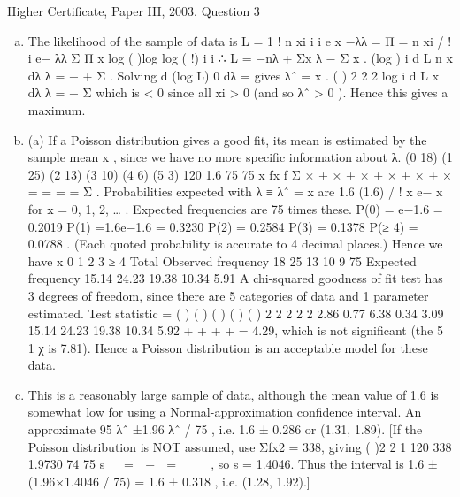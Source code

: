 \documentclass[a4paper,12pt]{article}
\begin{document}
Higher Certificate, Paper III, 2003. Question 3
\begin{enumerate}[(a)]
\item  The likelihood of the sample of data is L =
1 !
n xi
i i
e
x
−λλ
= Π
= n xi / !
i e− λλ Σ Π x
log ( )log log ( !) i i ∴ L = −nλ + Σx λ − Σ x .
(log ) i d L n x
dλ λ
= − + Σ . Solving d (log L) 0
dλ
= gives λˆ = x .
( )
2
2 2 log i d L x
dλ λ
= − Σ which is < 0 since all xi > 0 (and so λˆ > 0 ). Hence this
gives a maximum.
\item (a) If a Poisson distribution gives a good fit, its mean is estimated by the
sample mean x , since we have no more specific information about λ.
(0 18) (1 25) (2 13) (3 10) (4 6) (5 3) 120 1.6
75 75
x fx
f
Σ × + × + × + × + × + × = = = =
Σ
.
Probabilities expected with λ ≡ λˆ = x are 1.6 (1.6) / ! x e− x for x = 0, 1, 2, … .
Expected frequencies are 75 times these.
P(0) = e−1.6 = 0.2019 P(1) =1.6e−1.6 = 0.3230 P(2) = 0.2584
P(3) = 0.1378 P(≥ 4) = 0.0788 .
(Each quoted probability is accurate to 4 decimal places.)
Hence we have
x 0 1 2 3 ≥ 4 Total
Observed frequency 18 25 13 10 9 75
Expected frequency 15.14 24.23 19.38 10.34 5.91
A chi-squared goodness of fit test has 3 degrees of freedom, since there are 5
categories of data and 1 parameter estimated.
Test statistic = ( ) ( ) ( ) ( ) ( ) 2 2 2 2 2 2.86 0.77 6.38 0.34 3.09
15.14 24.23 19.38 10.34 5.92
+ + + + = 4.29, which
is not significant (the 5%
1 χ is 7.81). Hence a Poisson distribution is
an acceptable model for these data.
\item This is a reasonably large sample of data, although the mean value of
1.6 is somewhat low for using a Normal-approximation confidence interval.
An approximate 95%
λˆ ±1.96 λˆ / 75 , i.e. 1.6 ± 0.286 or (1.31, 1.89).
[If the Poisson distribution is NOT assumed, use Σfx2 = 338, giving
( )2
2 1 120 338 1.9730
74 75
s
 
=  −  =
 
 
, so s = 1.4046. Thus the interval is
1.6 ± (1.96×1.4046 / 75) = 1.6 ± 0.318 , i.e. (1.28, 1.92).]
\end{enumerate}
\end{document}

